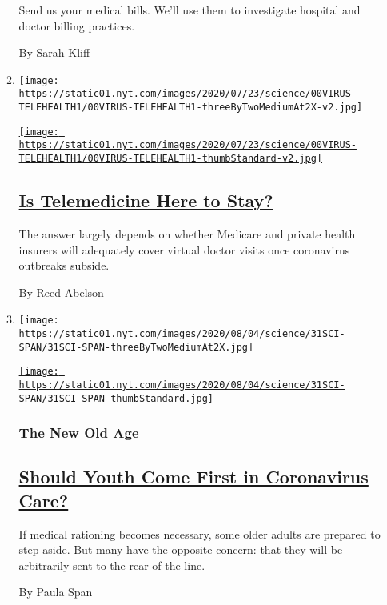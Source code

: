 \begin{enumerate}
\begin{enumerate}
    Send us your medical bills. We'll use them to investigate hospital
    and doctor billing practices.

    By Sarah Kliff
  \item
    \texttt{[image: https://static01.nyt.com/images/2020/07/23/science/00VIRUS-TELEHEALTH1/00VIRUS-TELEHEALTH1-threeByTwoMediumAt2X-v2.jpg]}

    \href{/2020/08/03/health/covid-telemedicine-congress.html}{\texttt{[image: https://static01.nyt.com/images/2020/07/23/science/00VIRUS-TELEHEALTH1/00VIRUS-TELEHEALTH1-thumbStandard-v2.jpg]}}

    \hypertarget{is-telemedicine-here-to-stay}{%
    \subsection{\texorpdfstring{\href{/2020/08/03/health/covid-telemedicine-congress.html}{Is
    Telemedicine Here to
    Stay?}}{Is Telemedicine Here to Stay?}}\label{is-telemedicine-here-to-stay}}

    The answer largely depends on whether Medicare and private health
    insurers will adequately cover virtual doctor visits once
    coronavirus outbreaks subside.

    By Reed Abelson
  \item
    \texttt{[image: https://static01.nyt.com/images/2020/08/04/science/31SCI-SPAN/31SCI-SPAN-threeByTwoMediumAt2X.jpg]}

    \href{/2020/07/31/health/coronavirus-ethics-rationing-elderly.html}{\texttt{[image: https://static01.nyt.com/images/2020/08/04/science/31SCI-SPAN/31SCI-SPAN-thumbStandard.jpg]}}

    \hypertarget{the-new-old-age}{%
    \subsubsection{The New Old Age}\label{the-new-old-age}}

    \hypertarget{should-youth-come-first-in-coronavirus-care}{%
    \subsection{\texorpdfstring{\href{/2020/07/31/health/coronavirus-ethics-rationing-elderly.html}{Should
    Youth Come First in Coronavirus
    Care?}}{Should Youth Come First in Coronavirus Care?}}\label{should-youth-come-first-in-coronavirus-care}}

    If medical rationing becomes necessary, some older adults are
    prepared to step aside. But many have the opposite concern: that
    they will be arbitrarily sent to the rear of the line.

    By Paula Span
  \end{enumerate}
\end{enumerate}

